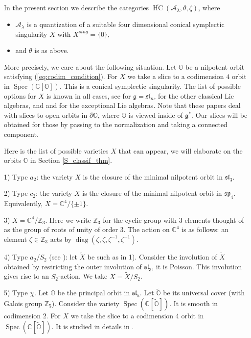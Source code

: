 \documentclass[12pt]{amsart}
\newcommand{\C}{\mathbb{C}}
\newcommand{\A}{\mathcal{A}}
\newcommand{\g}{\mathfrak{g}}
\newcommand{\Orb}{\mathbb{O}}
\newcommand{\HC}{\operatorname{HC}}
\newcommand{\Spec}{\operatorname{Spec}}
\theoremstyle{definition}
\numberwithin{equation}{section}
\begin{document}
In the present section we describe the categories $\overline{\HC}(\A_\lambda,\theta,\zeta)$, where
\begin{itemize}
\item
$\A_\lambda$ is a quantization of a suitable four dimensional conical symplectic singularity $X$
with $X^{sing}=\{0\}$,
\item and $\theta$ is as above.
\end{itemize}

More precisely, we care about the following situation.
Let $\Orb$ be a nilpotent orbit satisfying (\ref{eq:codim_condition}). For $X$ we take
a slice to a codimension $4$ orbit in $\operatorname{Spec}(\C[\Orb])$. This is a conical
symplectic singularity. The list of possible options for $X$ is known in  all
cases, see \cite{KP1} for $\g=\mathfrak{sl}_n$, \cite{KP2} for the other classical Lie algebras,
and \cite{FJLS1} and \cite{FJLS2} for the exceptional Lie algebras.
Note that these papers deal with slices to open orbits in $\partial\Orb$,
where $\Orb$ is viewed inside of $\g^*$. Our slices will be obtained for those by passing to the normalization and taking a connected component.

Here is the list of possible varieties $X$ that can appear, we will elaborate on
the orbits $\Orb$ in Section \ref{S_classif_thm}.

1) Type $a_2$: the variety $X$ is the closure of the minimal nilpotent orbit in
$\mathfrak{sl}_3$.

2) Type $c_2$: the variety $X$ is the closure of the minimal nilpotent orbit
in $\mathfrak{sp}_4$. Equivalently, $X=\C^4/\{\pm 1\}$.

3) $X=\C^4/\mathbb{Z}_3$. Here we write $\mathbb{Z}_3$ for the cyclic group with
3 elements thought of as the group of roots of unity of order $3$.
The action on $\C^4$ is as follows: an element $\zeta\in \mathbb{Z}_3$
acts by $\operatorname{diag}(\zeta,\zeta,\zeta^{-1},\zeta^{-1})$.

4) Type $a_2/S_2$ (see \cite[Prop. 3.7]{FJLS2}): let $\tilde{X}$ be such as in 1). Consider the involution
of $\tilde{X}$ obtained by restricting the outer involution of $\mathfrak{sl}_3$,
it is Poisson. This involution gives rise to an $S_2$-action. We take $X=\tilde{X}/S_2$.

5) Type $\chi$. Let $\Orb$ be the principal orbit in $\mathfrak{sl}_5$. Let $\tilde{\Orb}$
be its universal cover (with Galois group $\mathbb{Z}_5$). Consider the variety
$\Spec(\C[\tilde{\Orb}])$. It is smooth in codimension $2$. For $X$ we take
the slice to a codimension $4$ orbit in $\Spec(\C[\tilde{\Orb}])$. It is studied in details in \cite{BBFJLS1}.
\end{document}
